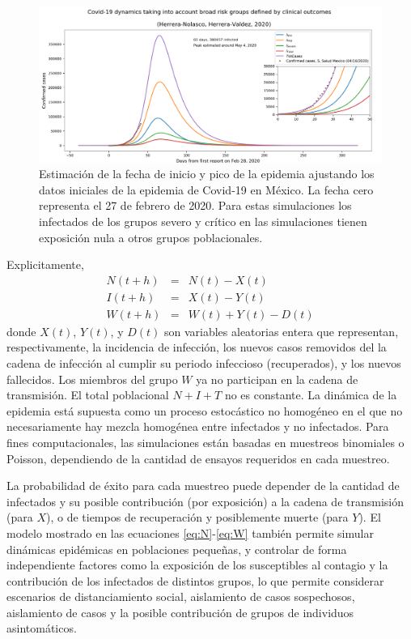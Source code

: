 \begin{figure}[h] 
\includegraphics[width=\textwidth]{../tsam_Covid19_models/figures/Covid19_Mexico_InitialFit_Herrera-Valdez+Herrera-Nolasco_2020}
\caption{Estimación de la fecha de inicio y pico de la epidemia ajustando los datos iniciales de la epidemia de Covid-19 en México. La fecha cero representa el 27 de febrero de 2020. Para estas simulaciones los infectados de los grupos severo y crítico en las simulaciones tienen exposición nula a otros grupos poblacionales. } \label{fig:inicioPicoNIW}
\end{figure}




Explicitamente,
\begin{eqnarray}
N(t+h) &=& N(t) - X(t)
 \label{eq:N} \\
I(t+h) &=& X(t) - Y(t)
\label{eq:I}\\
W(t+h) &=& W(t) + Y(t) - D(t)
\label{eq:W}
\end{eqnarray}
donde $X(t)$, $Y(t)$, y $D(t)$ son variables aleatorias entera que representan, respectivamente, la incidencia de infección, los nuevos casos removidos del la cadena de infección al cumplir su periodo infeccioso (recuperados), y los nuevos fallecidos. Los miembros del grupo $W$ ya no participan en la cadena de transmisión. El total poblacional $N+I+T$ no es constante. La dinámica de la epidemia está supuesta como un proceso estocástico no homogéneo en el que no necesariamente hay mezcla homogénea entre infectados y no infectados. Para fines computacionales, las simulaciones están basadas en muestreos binomiales o Poisson, dependiendo de la cantidad de ensayos requeridos en cada muestreo. 

 La probabilidad de éxito para cada muestreo puede depender de la cantidad de infectados y su posible contribución (por exposición) a la cadena de transmisión (para $X$), o de tiempos de recuperación y posiblemente muerte (para $Y$). El modelo mostrado en las ecuaciones \eqref{eq:N}-\eqref{eq:W} también permite simular dinámicas epidémicas en poblaciones pequeñas, y controlar de forma independiente  factores como la exposición de los susceptibles al contagio y la contribución de los infectados de distintos grupos, lo que permite considerar escenarios de distanciamiento social, aislamiento de casos sospechosos, aislamiento de casos y la posible contribución de grupos de individuos asintomáticos. 


